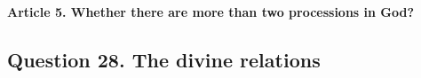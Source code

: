 \documentclass{ucetd}
\begin{document}
\paragraph{Article 5. Whether there are more than two processions in God?}
\subsection{Question 28. The divine relations}
\end{document}
